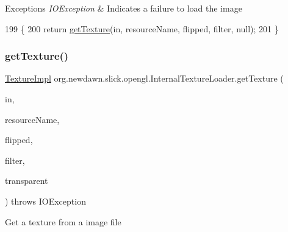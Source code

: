 \begin{DoxyExceptions}{Exceptions}
{\em I\+O\+Exception} & Indicates a failure to load the image \\
\hline
\end{DoxyExceptions}

\begin{DoxyCode}
199                                                                                                            
              \{
200         \textcolor{keywordflow}{return} \mbox{\hyperlink{classorg_1_1newdawn_1_1slick_1_1opengl_1_1_internal_texture_loader_a5d76355a0aa7c2b3d7dd6106412d5805}{getTexture}}(in, resourceName, flipped, filter, null);
201     \}
\end{DoxyCode}
\mbox{\label{classorg_1_1newdawn_1_1slick_1_1opengl_1_1_internal_texture_loader_aab0726a2bebb2b26791977daa6c53a2b}} 
\subsubsection{\texorpdfstring{get\+Texture()}{getTexture()}\hspace{0.1cm}{\footnotesize\ttfamily [6/8]}}
{\footnotesize\ttfamily \mbox{\hyperlink{classorg_1_1newdawn_1_1slick_1_1opengl_1_1_texture_impl}{Texture\+Impl}} org.\+newdawn.\+slick.\+opengl.\+Internal\+Texture\+Loader.\+get\+Texture (\begin{DoxyParamCaption}\item[{Input\+Stream}]{in,  }\item[{String}]{resource\+Name,  }\item[{boolean}]{flipped,  }\item[{int}]{filter,  }\item[{int \mbox{[}$\,$\mbox{]}}]{transparent }\end{DoxyParamCaption}) throws I\+O\+Exception\hspace{0.3cm}{\ttfamily [inline]}}

Get a texture from a image file


